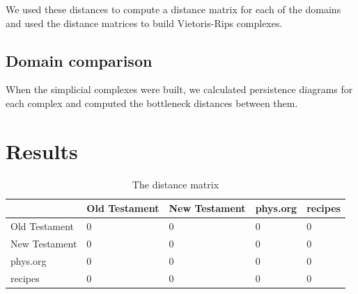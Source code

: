 \documentclass[12pt,a4paper]{amsart}
\begin{document}
We used these distances to compute a distance matrix for each of the
domains and used the distance matrices to build Vietoris-Rips complexes.

\subsection{Domain comparison}

When the simplicial complexes were built, we calculated persistence diagrams for
each complex and computed the bottleneck distances between them.

\section{Results}

\begin{table}
  \centering
  \begin{tabular}{l|llll}
                  & Old Testament & New Testament & phys.org & recipes \\ \hline
    Old Testament & 0 & 0 & 0 & 0 \\
    New Testament & 0 & 0 & 0 & 0 \\
    phys.org      & 0 & 0 & 0 & 0 \\
    recipes       & 0 & 0 & 0 & 0 \\
  \end{tabular}
  \caption{The distance matrix}
  \label{tab:}
\end{table}
\end{document}
